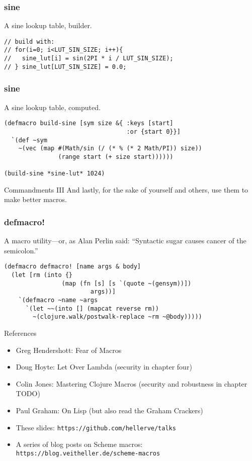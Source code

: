 \documentclass[aspectratio=169]{beamer}
\begin{document}
  \begin{frame}[fragile]
    \frametitle{sine}
    \begin{listing}[H]
      \caption{A sine lookup table, builder.}
      \begin{verbatim}
// build with:
// for(i=0; i<LUT_SIN_SIZE; i++){
//   sine_lut[i] = sin(2PI * i / LUT_SIN_SIZE);
// } sine_lut[LUT_SIN_SIZE] = 0.0;
      \end{verbatim}
    \end{listing}
  \end{frame}
  \begin{frame}[fragile]
    \frametitle{sine}
    \begin{listing}[H]
      \caption{A sine lookup table, computed.}
      \begin{verbatim}
(defmacro build-sine [sym size &{ :keys [start] 
                                  :or {start 0}}]
  `(def ~sym
    ~(vec (map #(Math/sin (/ (* % (* 2 Math/PI)) size))
               (range start (+ size start))))))

(build-sine *sine-lut* 1024)
      \end{verbatim}
    \end{listing}
  \end{frame}
  \begin{frame}{Commandments III}
    \Large And lastly, for the sake of yourself and others, use them to make better macros.
  \end{frame}
  \begin{frame}[fragile]
    \frametitle{defmacro!}
    \begin{listing}[H]
      \caption{A macro utility—or, as Alan Perlin said: “Syntactic sugar causes cancer of the semicolon.”}
      \begin{verbatim}
(defmacro defmacro! [name args & body]
  (let [rm (into {}
                (map (fn [s] [s `(quote ~(gensym))])
                        args))]
    `(defmacro ~name ~args
      `(let ~~(into [] (mapcat reverse rm))
        ~(clojure.walk/postwalk-replace ~rm ~@body)))))
      \end{verbatim}
    \end{listing}
  \end{frame}
  \begin{frame}{References}
    \begin{itemize}
      \item Greg Hendershott: Fear of Macros
      \item Doug Hoyte: Let Over Lambda (security in chapter four)
      \item Colin Jones: Mastering Clojure Macros (security and robustness in chapter TODO)
      \item Paul Graham: On Lisp (but also read the Graham Crackers)
      \item These slides: \texttt{https://github.com/hellerve/talks}
      \item A series of blog posts on Scheme macros: \texttt{https://blog.veitheller.de/scheme-macros}
    \end{itemize}
  \end{frame}
\end{document}
